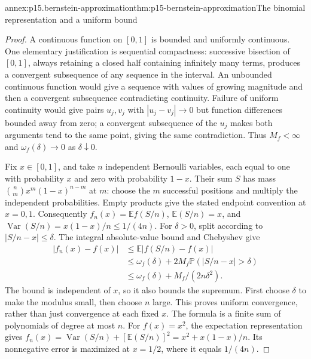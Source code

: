 \begin{annexitem}{annex:p15.bernstein-approximation}{thm:p15-bernstein-approximation}{The binomial representation and a uniform bound}
\begin{proof}
A continuous function on \([0,1]\) is bounded and uniformly
continuous. One elementary justification is sequential compactness:
successive bisection of \([0,1]\), always retaining a closed half
containing infinitely many terms, produces a convergent subsequence
of any sequence in the interval. An unbounded continuous function
would give a sequence with values of growing magnitude and then a
convergent subsequence contradicting continuity. Failure of uniform
continuity would give pairs \(u_j,v_j\) with \(|u_j-v_j|\to0\)
but function differences bounded away from zero; a convergent
subsequence of the \(u_j\) makes both arguments tend to the same
point, giving the same contradiction. Thus \(M_f<\infty\) and
\(\omega_f(\delta)\to0\) as \(\delta\downarrow0\).

Fix \(x\in[0,1]\), and take \(n\) independent Bernoulli variables,
each equal to one with probability \(x\) and zero with probability
\(1-x\). Their sum \(S\) has mass
\(\binom nm x^m(1-x)^{n-m}\) at \(m\): choose the \(m\) successful
positions and multiply the independent probabilities. Empty products
give the stated endpoint convention at \(x=0,1\).
Consequently \(f_n(x)=\mathbb E f(S/n)\),
\(\mathbb E(S/n)=x\), and
\(\operatorname{Var}(S/n)=x(1-x)/n\leq1/(4n)\).
For \(\delta>0\), split according to \(|S/n-x|\leq\delta\).
The integral absolute-value bound and Chebyshev give
\[
 \begin{aligned}
 |f_n(x)-f(x)|
 &\leq\mathbb E|f(S/n)-f(x)|\\
 &\leq\omega_f(\delta)+2M_f\mathbb P(|S/n-x|>\delta)\\
 &\leq\omega_f(\delta)+M_f/(2n\delta^2).
 \end{aligned}
\]
The bound is independent of \(x\), so it also bounds the supremum.
First choose \(\delta\) to make the modulus small, then choose \(n\)
large. This proves uniform convergence, rather than just convergence
at each fixed \(x\). The formula is a finite sum of polynomials of
degree at most \(n\).
For \(f(x)=x^2\), the expectation representation gives
\(f_n(x)=\operatorname{Var}(S/n)+[\mathbb E(S/n)]^2
=x^2+x(1-x)/n\). Its nonnegative error is maximized at \(x=1/2\),
where it equals \(1/(4n)\).
\end{proof}
\end{annexitem}

